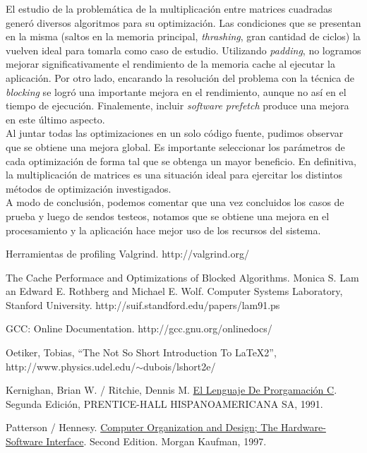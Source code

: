 \documentclass[a4paper,10pt]{article}
\begin{document}
El estudio de la problem\'atica de la multiplicaci\'on entre matrices cuadradas gener\'o diversos algoritmos para su optimizaci\'on. Las condiciones que se presentan en la misma (saltos en la memoria principal, \textit{thrashing}, gran cantidad de ciclos) la vuelven ideal para tomarla como caso de estudio. Utilizando \textit{padding}, no logramos mejorar significativamente el rendimiento de la memoria cache al ejecutar la aplicaci\'on. Por otro lado, encarando la resoluci\'on del problema con la t\'ecnica de \textit{blocking} se logr\'o una importante mejora en el rendimiento, aunque no as\'i en el tiempo de ejecuci\'on. 
Finalemente, incluir \textit{software prefetch}  produce una mejora en este \'ultimo aspecto.\\
Al juntar todas las optimizaciones en un solo c\'odigo fuente, pudimos observar que se obtiene una mejora global. Es importante seleccionar los par\'ametros de cada optimizaci\'on de forma tal que se obtenga un mayor beneficio.
En definitiva, la multiplicaci\'on de matrices es una situaci\'on ideal para ejercitar los distintos m\'etodos de optimizaci\'on investigados.\\


A modo de conclusi\'on, podemos comentar que una vez concluidos los casos de prueba y luego de sendos testeos, notamos que se obtiene una mejora en el procesamiento y la aplicaci\'on hace mejor uso de los recursos del sistema.\\
\pagebreak




\begin{thebibliography}{99}

 Herramientas de profiling Valgrind. http://valgrind.org/

 The Cache Performace and Optimizations of Blocked Algorithms. Monica S. Lam an Edward E. Rothberg and Michael E. Wolf. Computer Systems Laboratory, Stanford University. http://suif.standford.edu/papers/lam91.ps

 GCC: Online Documentation. http://gcc.gnu.org/onlinedocs/

 Oetiker, Tobias, ``The Not So Short Introduction To LaTeX2'', http://www.physics.udel.edu/$\sim$dubois/lshort2e/

 Kernighan, Brian W. / Ritchie, Dennis M. \underline{El Lenguaje De Prorgamaci\'on C}. Segunda Edici\'on, PRENTICE-HALL HISPANOAMERICANA SA, 1991.

 Patterson / Hennesy. \underline{Computer Organization and Design; The Hardware-Software Interface}. Second Edition. Morgan Kaufman, 1997.

\end{thebibliography}
\end{document}
